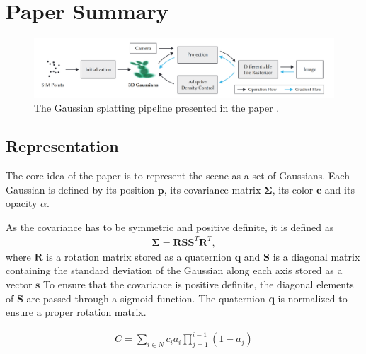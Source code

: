 

\section{Paper Summary}

\begin{figure}
    \centering
    \includegraphics[width=\textwidth]{images/pipeline.png}
    \caption{The Gaussian splatting pipeline presented in the paper \cite[Fig. 2]{kerbl3DGaussianSplatting2023}.}
\end{figure}


\subsection{Representation}
The core idea of the paper is to represent the scene as a set of Gaussians.
Each Gaussian is defined by its position $\bm{p}$, its covariance matrix $\bm{\Sigma}$, its color $\bm{c}$ and its opacity $\alpha$.

As the covariance has to be symmetric and positive definite, it is defined as
\begin{align}
    \bm{\Sigma} = \bm{R} \bm{S} \bm{S}^T \bm{R}^T,
\end{align}
where $\bm{R}$ is a rotation matrix stored as a quaternion $\bm{q}$ and $\bm{S}$ is a diagonal matrix containing the standard deviation of the Gaussian along each axis stored as a vector $\bm{s}$
To ensure that the covariance is positive definite, the diagonal elements of $\bm{S}$ are passed through a sigmoid function.
The quaternion $\bm{q}$ is normalized to ensure a proper rotation matrix.

\begin{align}
    C = \sum_{i \in N} c_i a_i \prod_{j=1}^{i-1} (1-a_j)
    \label{eq:alpha_blending}
\end{align}


